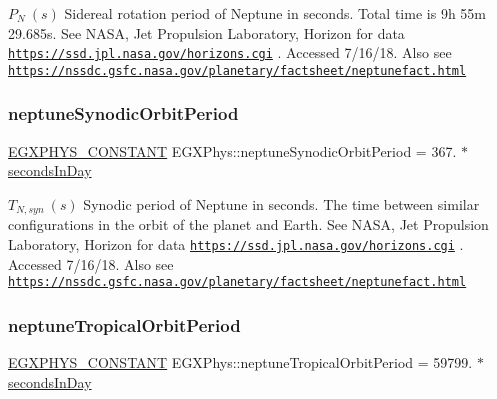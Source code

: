 $ P_{N} \ (s)$ Sidereal rotation period of Neptune in seconds. Total time is 9h 55m 29.\+685s. See N\+A\+SA, Jet Propulsion Laboratory, Horizon for data \href{https://ssd.jpl.nasa.gov/horizons.cgi}{\tt https\+://ssd.\+jpl.\+nasa.\+gov/horizons.\+cgi} . Accessed 7/16/18. Also see \href{https://nssdc.gsfc.nasa.gov/planetary/factsheet/neptunefact.html}{\tt https\+://nssdc.\+gsfc.\+nasa.\+gov/planetary/factsheet/neptunefact.\+html} \mbox{\label{group___e_g_x_phys-_constants-_astrophysics-_solar_system-_neptune-_orbit_ga2d54203662fda436f2aec854aa414896}} 
\subsubsection{\texorpdfstring{neptune\+Synodic\+Orbit\+Period}{neptuneSynodicOrbitPeriod}}
{\footnotesize\ttfamily \mbox{\hyperlink{group___e_g_x_phys-_constants-_macros_ga76980d288494ce1714c9ac68a95ba702}{E\+G\+X\+P\+H\+Y\+S\+\_\+\+C\+O\+N\+S\+T\+A\+NT}} E\+G\+X\+Phys\+::neptune\+Synodic\+Orbit\+Period = 367. $\ast$\mbox{\hyperlink{namespace_e_g_x_phys_a93d2a00d75411b58cbf63ab3fd1f8bc2}{seconds\+In\+Day}}}

$ T_{N,syn} \ (s)$ Synodic period of Neptune in seconds. The time between similar configurations in the orbit of the planet and Earth. See N\+A\+SA, Jet Propulsion Laboratory, Horizon for data \href{https://ssd.jpl.nasa.gov/horizons.cgi}{\tt https\+://ssd.\+jpl.\+nasa.\+gov/horizons.\+cgi} . Accessed 7/16/18. Also see \href{https://nssdc.gsfc.nasa.gov/planetary/factsheet/neptunefact.html}{\tt https\+://nssdc.\+gsfc.\+nasa.\+gov/planetary/factsheet/neptunefact.\+html} \mbox{\label{group___e_g_x_phys-_constants-_astrophysics-_solar_system-_neptune-_orbit_gad68a2114ccb061c79cee84aafeaa8a35}} 
\subsubsection{\texorpdfstring{neptune\+Tropical\+Orbit\+Period}{neptuneTropicalOrbitPeriod}}
{\footnotesize\ttfamily \mbox{\hyperlink{group___e_g_x_phys-_constants-_macros_ga76980d288494ce1714c9ac68a95ba702}{E\+G\+X\+P\+H\+Y\+S\+\_\+\+C\+O\+N\+S\+T\+A\+NT}} E\+G\+X\+Phys\+::neptune\+Tropical\+Orbit\+Period = 59799. $\ast$\mbox{\hyperlink{namespace_e_g_x_phys_a93d2a00d75411b58cbf63ab3fd1f8bc2}{seconds\+In\+Day}}}

